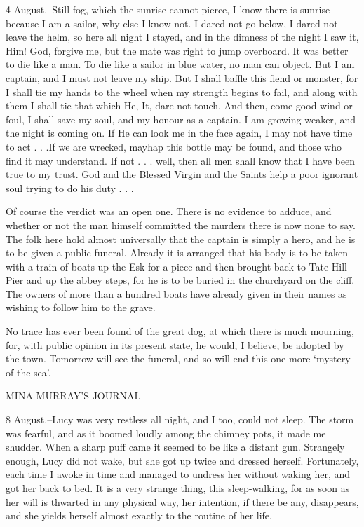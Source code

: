 4 August.--Still fog, which the sunrise cannot pierce, I know there is sunrise because I am a sailor, why else I know not. I dared not go below, I dared not leave the helm, so here all night I stayed, and in the dimness of the night I saw it, Him! God, forgive me, but the mate was right to jump overboard. It was better to die like a man. To die like a sailor in blue water, no man can object. But I am captain, and I must not leave my ship. But I shall baffle this fiend or monster, for I shall tie my hands to the wheel when my strength begins to fail, and along with them I shall tie that which He, It, dare not touch. And then, come good wind or foul, I shall save my soul, and my honour as a captain. I am growing weaker, and the night is coming on. If He can look me in the face again, I may not have time to act . . .If we are wrecked, mayhap this bottle may be found, and those who find it may understand. If not . . . well, then all men shall know that I have been true to my trust. God and the Blessed Virgin and the Saints help a poor ignorant soul trying to do his duty . . . 

Of course the verdict was an open one. There is no evidence to adduce, and whether or not the man himself committed the murders there is now none to say. The folk here hold almost universally that the captain is simply a hero, and he is to be given a public funeral. Already it is arranged that his body is to be taken with a train of boats up the Esk for a piece and then brought back to Tate Hill Pier and up the abbey steps, for he is to be buried in the churchyard on the cliff. The owners of more than a hundred boats have already given in their names as wishing to follow him to the grave. 

No trace has ever been found of the great dog, at which there is much mourning, for, with public opinion in its present state, he would, I believe, be adopted by the town. Tomorrow will see the funeral, and so will end this one more `mystery of the sea'. 

MINA MURRAY'S JOURNAL 

8 August.--Lucy was very restless all night, and I too, could not sleep. The storm was fearful, and as it boomed loudly among the chimney pots, it made me shudder. When a sharp puff came it seemed to be like a distant gun. Strangely enough, Lucy did not wake, but she got up twice and dressed herself. Fortunately, each time I awoke in time and managed to undress her without waking her, and got her back to bed. It is a very strange thing, this sleep-walking, for as soon as her will is thwarted in any physical way, her intention, if there be any, disappears, and she yields herself almost exactly to the routine of her life. 

